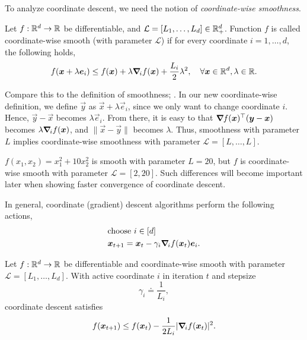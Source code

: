 To analyze coordinate descent, we need the notion of \textit{coordinate-wise smoothness}.

\begin{definition}
    Let $f: \R^d \to \R$ be differentiable, and $\mathcal{L} = [L_1, \ldots, L_d] \in \R^d_+$.
    Function $f$ is called coordinate-wise smooth (with parameter $\mathcal{L}$) if for every
    coordinate $i=1,\ldots,d$, the following holds, \[
        f(\vec{x} + \lambda \vec{e}_i) \leq f(\vec{x}) + \lambda \grad{f(\vec{x})}{i} + \frac{L_i}{2} \lambda^2, \quad \forall \vec{x}\in \R^d, \lambda \in \R.
    \]
\end{definition}

Compare this to the definition of smoothness; . In our new coordinate-wise
definition, we define $\vec{y}$ as $\vec{x} + \lambda \vec{e}_i$, since we only want to change
coordinate $i$. Hence, $\vec{y}-\vec{x}$ becomes $\lambda \vec{e}_i$. From there, it is easy to
that $\transpose{\grad{f(\vec{x})}{}}(\vec{y} - \vec{x})$ becomes $\lambda \grad{f(\vec{x})}{i}$,
and $\| \vec{x}-\vec{y} \|$ becomes $\lambda$. Thus, smoothness with parameter $L$ implies
coordinate-wise smoothness with parameter $\mathcal{L} = [L, \ldots, L]$.

\begin{example}
    $f(x_1, x_2) = x_1^2 + 10x_2^2$ is smooth with parameter $L = 20$, but $f$ is coordinate-wise
    smooth with parameter $\mathcal{L} = [2, 20]$. Such differences will become important later when
    showing faster convergence of coordinate descent.
\end{example}

In general, coordinate (gradient) descent algorithms perform the following actions,
\begin{align*}
     & \text{choose $i \in [d]$}                                              \\
     & \vec{x}_{t+1} = \vec{x}_t - \gamma_i \grad{f(\vec{x}_t)}{i} \vec{e}_i.
\end{align*}

\begin{lemma}
    Let $f: \R^d \to \R$ be differentiable and coordinate-wise smooth with parameter $\mathcal{L} =
        [L_1, \ldots, L_d]$. With active coordinate $i$ in iteration $t$ and stepsize \[
        \gamma_i \doteq \frac{1}{L_i},
    \]
    coordinate descent satisfies \[
        f(\vec{x}_{t+1}) \leq f(\vec{x}_t) - \frac{1}{2 L_i} | \grad{f(\vec{x}_t)}{i} |^2.
    \]
\end{lemma}

